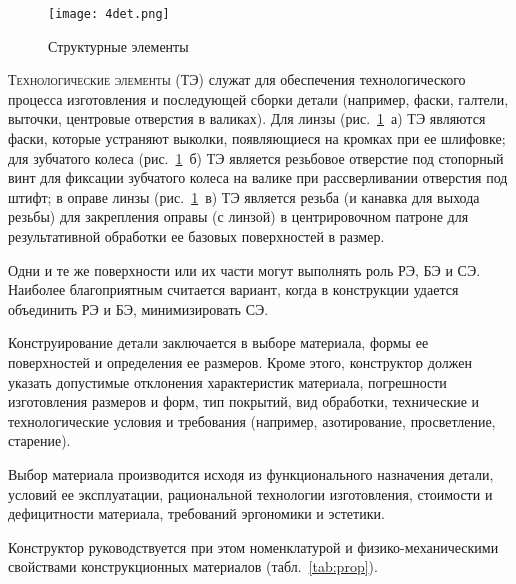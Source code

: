 \begin{figure}[h!]
	\caption[Структурные элементы деталей]{Структурные элементы}
	\texttt{[image: 4det.png]}
	\label{pic:4det}
\end{figure}

\textsc{Технологические элементы} (ТЭ) служат для обеспечения технологического процесса изготовления и последующей сборки детали (например, фаски, галтели, выточки, центровые отверстия в валиках). Для линзы (рис.~\ref{pic:4det}~а) ТЭ являются фаски, которые устраняют выколки, появляющиеся на кромках при ее шлифовке; для зубчатого колеса (рис.~\ref{pic:4det}~б) ТЭ является резьбовое отверстие под стопорный винт для фиксации зубчатого колеса на валике при рассверливании отверстия под штифт; в оправе линзы (рис.~\ref{pic:4det}~в) ТЭ является резьба (и канавка для выхода резьбы) для закрепления оправы (с линзой) в центрировочном патроне для результативной обработки ее базовых поверхностей в размер.

Одни и те же поверхности или их части могут выполнять роль РЭ, БЭ и СЭ. Наиболее благоприятным считается вариант, когда в конструкции удается объединить РЭ и БЭ, минимизировать СЭ.

Конструирование детали заключается в выборе материала, формы ее поверхностей и определения ее размеров. Кроме этого, конструктор должен указать допустимые отклонения характеристик материала, погрешности изготовления размеров и форм, тип покрытий, вид обработки, технические и технологические условия и требования (например, азотирование, просветление, старение).

Выбор материала производится исходя из функционального назначения детали, условий ее эксплуатации, рациональной технологии изготовления, стоимости и дефицитности материала, требований эргономики и эстетики.

Конструктор руководствуется при этом номенклатурой и физико-механическими свойствами конструкционных материалов (табл.~\ref{tab:prop}).

